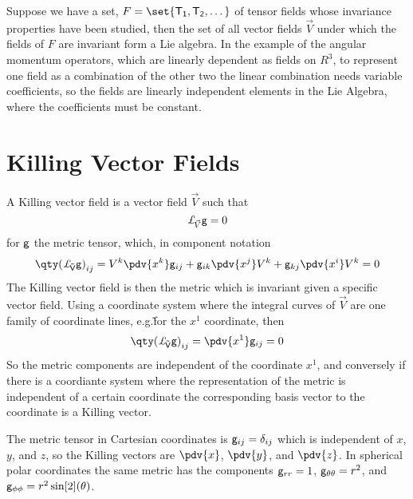 Suppose we have a set, $F = \set{\ten{T_1}, \ten{T_2}, \dots}$ of
tensor fields whose invariance properties have been studied, then the
set of all vector fields $\vec{V}$ under which the fields of $F$ are
invariant form a Lie algebra. In the example of the angular momentum
operators, which are linearly dependent as fields on $R^3$, to
represent one field as a combination of the other two the linear
combination needs variable coefficients, so the fields are linearly
independent elements in the Lie Algebra, where the coefficients must
be constant.

\section{Killing Vector Fields}
\label{sec:kill-vect-fields}

A Killing vector field is a vector field $\vec{V}$ such that
\begin{equation}
  \label{eq:26}
  \ld{\vec{V}}{\ten{g}} = 0
\end{equation}
for $\mathsf{{g}}$ the metric tensor, which, in component notation
\begin{equation}
  \label{eq:27}
  \ten{\qty( \ld{\vec{V}}{g} )}_{ij} = V^k \pdv{x^k} \ten{g}_{ij}
                                     +\ten{g}_{ik} \pdv{x^j} V^k
                                     +\ten{g}_{kj} \pdv{x^i} V^k = 0
\end{equation}
The Killing vector field is then the metric which is invariant given a
specific vector field.  Using a coordinate system where the integral
curves of $\vec{V}$ are one family of coordinate lines, e.g.\~ for the
$x^1$ coordinate, then
\begin{equation}
  \label{eq:28}
  \ten{ \qty( \ld{\vec{V}}{g} )}_{ij} =\pdv{x^1} \ten{g}_{ij} =0
\end{equation}
So the metric components are independent of the coordinate $x^1$, and
conversely if there is a coordiante system where the representation of
the metric is independent of a certain coordinate the corresponding
basis vector to the coordinate is a Killing vector.

The metric tensor in Cartesian coordinates is $\mathsf{{g}}_{ij} =
\mathsf{{\delta}}_{ij}$ which is independent of $x$, $y$, and $z$, so the
Killing vectors are $\pdv{x}$, $\pdv{y}$, and $\pdv{z}$. In spherical
polar coordinates the same metric has the components $\mathsf{{g}}_{rr}=1$,
$\mathsf{{g}}_{\theta \theta}=r^2$, and $\mathsf{{g}}_{\phi \phi} = r^2
\sin[2](\theta)$.

